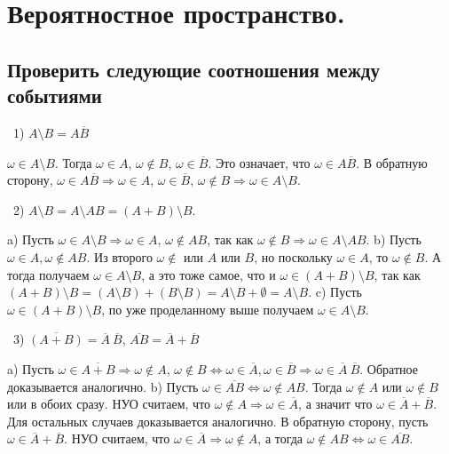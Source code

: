 
\section{Вероятностное пространство.}

\subsection{Проверить следующие соотношения между событиями}

\noindent~1) $A \setminus B = A \overline{B}$

 $\omega \in A \setminus B$. Тогда $\omega \in A$, $\omega \not\in B$, $
\omega \in \overline{B}$. Это означает, что $\omega \in A\overline{B}$. 
В обратную сторону, $\omega \in A\overline{B} \Rightarrow \omega \in A$, $\omega \in 
\overline{B}$, $\omega \not\in B \Rightarrow \omega \in A \setminus B$.

\medskip
\noindent~2) $A \setminus B = A \setminus AB = \left( A + B \right)  \setminus B$.

\noindent a) Пусть $\omega \in A \setminus B \Rightarrow \omega \in A$, $\omega \not\in AB$, так 
как $\omega \not\in B \Rightarrow \omega \in A \setminus AB$. 
b) Пусть $\omega \in A, \omega \not\in
AB$. Из второго $\omega \not\in$ или $A$ или $B$, но поскольку $\omega \in A$, то $\omega \not\in
B$. А тогда получаем $\omega \in A \setminus B$, а это тоже самое, что и $\omega \in (A + B) \setminus
B$, так как $(A + B) \setminus B = (A \setminus B) + (B \setminus B) = A \setminus B + \emptyset = 
A \setminus B$. 
c) Пусть $\omega \in (A + B) \setminus B$, по уже проделанному выше получаем $\omega
\in A \setminus B$.

\medskip
\noindent~3) $\overline{\left( A + B \right) } = \overline{A}~\overline{B}$, $\overline{AB} = \overline{A} + 
\overline{B}$

\noindent a) Пусть $\omega \in \overline{A + B} \Rightarrow \omega \not\in A$, $\omega \not\in B 
\Leftrightarrow \omega \in \overline{A}, \omega \in \overline{B} \Rightarrow \omega \in \overline{A}~
\overline{B}$. Обратное доказывается аналогично. b) Пусть $\omega \in \overline{AB} \Leftrightarrow 
\omega \not\in AB$. Тогда $\omega \not\in A$ или $\omega \not\in B$ или в обоих сразу. НУО считаем, что
$\omega \not\in A \Rightarrow \omega \in \overline{A}$, а значит что $\omega \in \overline{A} + 
\overline{B}$. Для остальных случаев доказывается аналогично. В обратную сторону, пусть $\omega \in
\overline{A} + \overline{B}$. НУО считаем, что $\omega \in \overline{A} \Rightarrow \omega \not\in A$, 
а тогда $\omega \not\in A B \Leftrightarrow \omega \in \overline{AB}$.

